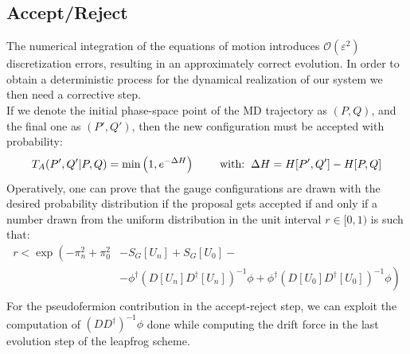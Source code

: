 \subsection{Accept/Reject}
The numerical integration of the equations of motion introduces $\mathcal{O}(\varepsilon^2)$ discretization errors, resulting in an approximately correct evolution. In order to obtain a deterministic process for the dynamical realization of our system we then need a corrective step.
\\ If we denote the initial phase-space point of the MD trajectory as $(P,Q)$, and the final one as $(P', Q')$, then the new configuration must be accepted with probability:
\begin{equation*}
    T_A(P',Q' | P, Q) = \min \left(1, e^{-\Delta H} \right) \hspace{8mm} \mbox{with:} \hspace{2mm} \Delta H = H[P', Q'] - H[P, Q]
\end{equation*}
Operatively, one can prove that the gauge configurations are drawn with the desired probability distribution if the proposal gets accepted if and only if a number drawn from the uniform distribution in the unit interval $r \in [0, 1)$ is such that:
\begin{equation}
\begin{split}
        r < \exp \left(-\pi_n^2 + \pi_0^2 \right. & - S_G[U_n] + S_G[U_0] - \\ 
       & \left. -\phi^\dagger(D[U_n]D^\dagger[U_n])^{-1} \phi + \phi^\dagger(D[U_0]D^\dagger[U_0])^{-1} \phi \right) \\
\end{split}
\end{equation}
For the pseudofermion contribution in the accept-reject step, we can exploit the computation of $(DD^\dagger)^{-1}\phi$ done while computing the drift force in the last evolution step of the leapfrog scheme.

